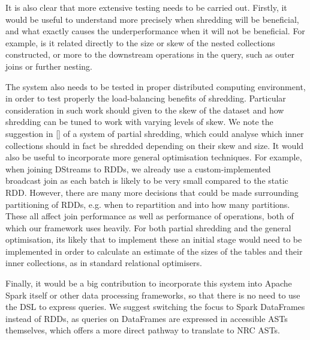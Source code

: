 It is also clear that more extensive testing needs to be carried out. Firstly, it would be useful to understand more precisely when shredding will be beneficial, and what exactly causes the underperformance when it will not be beneficial. For example, is it related directly to the size or skew of the nested collections constructed, or more to the downstream operations in the query, such as outer joins or further nesting.

The system also needs to be tested in proper distributed computing environment, in order to test properly the load-balancing benefits of shredding. Particular consideration in such work should given to the skew of the dataset and how shredding can be tuned to work with varying levels of skew. We note the suggestion in [] of a system of partial shredding, which could analyse which inner collections should in fact be shredded depending on their skew and size.
It would also be useful to incorporate more general optimisation techniques. For example, when joining DStreams to RDDs, we already use a custom-implemented broadcast join as each batch is likely to be very small compared to the static RDD. However, there are many more decisions that could be made surrounding partitioning of RDDs, e.g. when to repartition and into how many partitions. These all affect join performance as well as performance of  operations, both of which our framework uses heavily.
For both partial shredding and the general optimisation, its likely that to implement these an initial stage would need to be implemented in order to calculate an estimate of the sizes of the tables and their inner collections, as in standard relational optimisers.


Finally, it would be a big contribution to incorporate this system into Apache Spark itself or other data processing frameworks, so that there is no need to use the DSL to express queries. We suggest switching the focus to Spark DataFrames instead of RDDs, as queries on DataFrames are expressed in accessible ASTs themselves, which offers a more direct pathway to translate to NRC ASTs.
